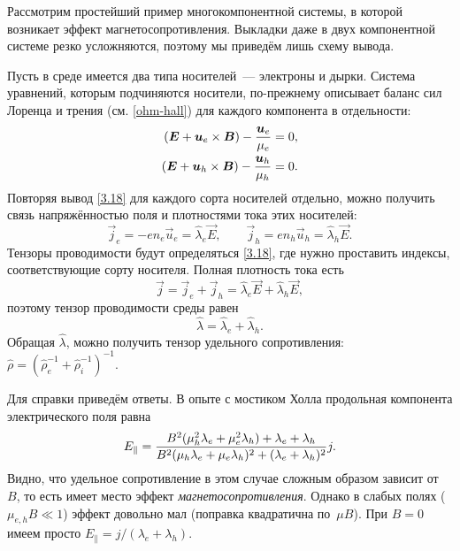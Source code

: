 \begin{lab:example}
Рассмотрим простейший пример многокомпонентной системы, в которой возникает
эффект магнетосопротивления. Выкладки даже в двух компонентной
системе резко усложняются, поэтому мы приведём лишь схему вывода.

Пусть в среде имеется два типа носителей~--- электроны и дырки. Система
уравнений, которым подчиняются носители, по-прежнему описывает баланс
сил Лоренца и трения (см. \eqref{ohm-hall}) для каждого компонента в
отдельности:
\begin{equation}
    \eqmark{two-component}
    \begin{aligned}
(\vec{E}+\vec{u}_e\times \vec{B}) - \frac{\vec{u}_e}{\mu_e} &=0,\\
(\vec{E}+\vec{u}_h\times \vec{B}) - \frac{\vec{u}_h}{\mu_h} &=0.
\end{aligned}
\end{equation}
Повторяя вывод \eqref{3.18} для каждого сорта носителей отдельно, можно
получить связь напряжённостью поля и плотностями тока этих носителей:
\begin{equation}
    \vec{j}_e = -en_e \vec{u}_e = \hat{\lambda}_e \vec{E},\qquad
    \vec{j}_h = en_h \vec{u}_h = \hat{\lambda}_h \vec{E}.
\end{equation}
Тензоры проводимости будут определяться \eqref{3.18}, где нужно проставить
индексы, соответствующие сорту носителя.
Полная плотность тока есть
\[
\vec{j} = \vec{j}_e + \vec{j}_h = \hat{\lambda}_e \vec{E} +
\hat{\lambda}_h \vec{E},
\]
поэтому тензор проводимости среды равен
\[
\hat{\lambda} = \hat{\lambda}_e + \hat{\lambda}_h.
\]
Обращая $\hat{\lambda}$, можно получить тензор удельного сопротивления:
$\hat{\rho}=
\left(\hat{\rho}_e^{-1}+\hat{\rho}_i^{-1}\right)^{-1}$.

Для справки приведём ответы.
В опыте с мостиком Холла продольная компонента электрического поля равна
\begin{equation}
\eqmark{lambda_twocomponent}
E_{\parallel} = \frac{B^2 (\mu_h^2 \lambda_e + \mu_e^2 \lambda_h) + \lambda_e+
    \lambda_h}%
{ B^2 (\mu_h \lambda_e + \mu_e \lambda_h)^2 + (\lambda_e+\lambda_h)^2}
j.
\end{equation}
Видно, что удельное сопротивление в этом случае сложным образом
зависит от~$B$, то есть имеет место эффект \emph{магнетосопротивления}.
Однако в слабых полях ($\mu_{e,h}B \ll 1$) эффект довольно мал (поправка
квадратична по~$\mu B$). При $B=0$ имеем просто
$E_{\parallel} = j/(\lambda_e+\lambda_h)$.


\end{lab:example}
